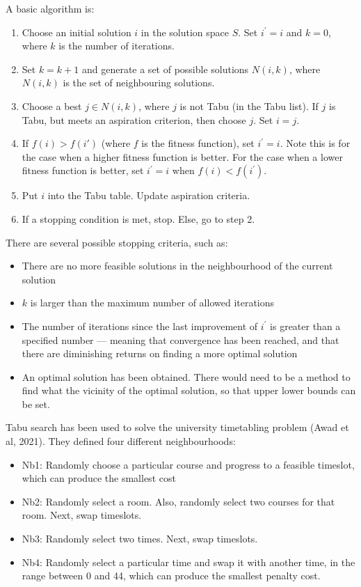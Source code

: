 \documentclass[a4paper, 12pt]{report}
\begin{document}
A basic algorithm is:
\begin{enumerate}
	\item Choose an initial solution \( i \) in the solution space \( S \).
		Set \( i^\prime=i \) and \( k = 0 \), where \( k \) is the number of
		iterations.
	\item Set \( k = k + 1 \) and generate a set of possible solutions
		\( N(i,k) \), where \( N(i,k) \) is the set of neighbouring solutions.
	\item Choose a best \( j \in N(i,k) \), where \( j \) is not Tabu (in the
		Tabu list).
		If \( j \) is Tabu, but meets an aspiration criterion, then choose
		\( j \).
		Set \( i = j \).
	\item If \( f(i) > f(i\prime) \) (where \( f \) is the fitness function),
		set \( i^\prime = i \).
		Note this is for the case when a higher fitness function is better.
		For the case when a lower fitness function is better, set
		\( i^\prime = i \) when \( f(i) < f(i^\prime) \).
	\item Put \( i \) into the Tabu table. Update aspiration criteria.
	\item If a stopping condition is met, stop. Else, go to step 2.
\end{enumerate}
There are several possible stopping criteria, such as:
\begin{itemize}
	\item There are no more feasible solutions in the neighbourhood of the
		current solution
	\item \( k \) is larger than the maximum number of allowed iterations
	\item The number of iterations since the last improvement of \( i^\prime \)
		is greater than a specified number –-- meaning that convergence has been
		reached, and that there are diminishing returns on finding a more
		optimal solution
	\item An optimal solution has been obtained.
		There would need to be a method to find what the vicinity of the optimal
		solution, so that upper lower bounds can be set.
\end{itemize}
Tabu search has been used to solve the university timetabling problem (Awad et
al, 2021). They defined four different neighbourhoods:
\begin{itemize}
	\item Nb1: Randomly choose a particular course and progress to a feasible
		timeslot, which can produce the smallest cost
	\item Nb2: Randomly select a room. Also, randomly select two courses for
		that room. Next, swap timeslots.
	\item Nb3: Randomly select two times. Next, swap timeslots.
	\item Nb4: Randomly select a particular time and swap it with another time,
		in the range between 0 and 44, which can produce the smallest penalty
		cost.
\end{itemize}
\end{document}
